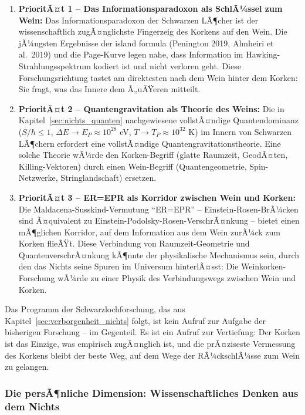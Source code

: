 ﻿\documentclass[12pt,a4paper]{report}
\begin{document}
\begin{enumerate}
	\item \textbf{PrioritÃ¤t 1 -- Das Informationsparadoxon als SchlÃ¼ssel zum Wein:} Das Informationsparadoxon der Schwarzen LÃ¶cher ist der wissenschaftlich zugÃ¤nglichste Fingerzeig des Korkens auf den Wein. Die jÃ¼ngsten Ergebnisse der \glqq island formula\grqq{} (Penington 2019, Almheiri et al.\ 2019) und die Page-Kurve legen nahe, dass Information im Hawking-Strahlungsspektrum kodiert ist und nicht verloren geht. Diese Forschungsrichtung tastet am direktesten nach dem Wein hinter dem Korken: Sie fragt, was das Innere dem Ã„uÃŸeren mitteilt.

	\item \textbf{PrioritÃ¤t 2 -- Quantengravitation als Theorie des Weins:} Die in Kapitel~\ref{sec:nichts_quanten} nachgewiesene vollstÃ¤ndige Quantendominanz ($S/\hbar \leq 1$, $\Delta E \to E_P \approx 10^{28}$ eV, $T \to T_P \approx 10^{32}$ K) im Innern von Schwarzen LÃ¶chern erfordert eine vollstÃ¤ndige Quantengravitationstheorie. Eine solche Theorie wÃ¼rde den Korken-Begriff (glatte Raumzeit, GeodÃ¤ten, Killing-Vektoren) durch einen Wein-Begriff (Quantengeometrie, Spin-Netzwerke, Stringlandschaft) ersetzen.

	\item \textbf{PrioritÃ¤t 3 -- ER=EPR als Korridor zwischen Wein und Korken:} Die Maldacena-Susskind-Vermutung ``ER=EPR'' -- Einstein-Rosen-BrÃ¼cken sind Ã¤quiva\-lent zu Einstein-Podolsky-Rosen-VerschrÃ¤nkung -- bietet einen mÃ¶glichen Korridor, auf dem Information aus dem Wein zurÃ¼ck zum Korken flieÃŸt. Diese Verbindung von Raumzeit-Geometrie und QuantenverschrÃ¤nkung kÃ¶nnte der physikalische Mechanismus sein, durch den das Nichts seine Spuren im Universum hinterlÃ¤sst: Die Weinkorken-Forschung wÃ¼rde zu einer Physik des Verbindungswegs zwischen Wein und Korken.
\end{enumerate}

Das Programm der Schwarzlochforschung, das aus Kapitel~\ref{sec:verborgenheit_nichts} folgt, ist kein Aufruf zur Aufgabe der bisherigen Forschung -- im Gegenteil. Es ist ein Aufruf zur Vertiefung: Der Korken ist das Einzige, was empirisch zugÃ¤nglich ist, und die prÃ¤ziseste Vermessung des Korkens bleibt der beste Weg, auf dem Wege der RÃ¼ckschlÃ¼sse zum Wein zu gelangen.

\subsubsection{Die persÃ¶nliche Dimension: Wissenschaftliches Denken aus dem Nichts}
\end{document}
